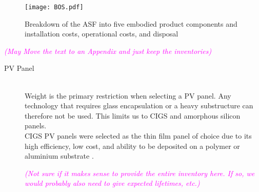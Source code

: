 \begin{figure}[ht]
\begin{center}
\texttt{[image: BOS.pdf]}
\caption{Breakdown of the ASF into five embodied product components and installation costs, operational costs, and disposal}

\label{fig:BOS}
\end{center}
\end{figure}
\textcolor{magenta}{\textit{(May Move the text to an Appendix and just keep the inventories)}}
\begin{description}

\item[PV Panel] \hfill\\
Weight is the primary restriction when selecting a PV panel. Any technology that requires glass encapsulation or a heavy substructure can therefore not be used. This limits us to CIGS and amorphous silicon panels.\\

CIGS PV panels were selected as the thin film panel of choice due to its high efficiency, low cost, and ability to be deposited on a polymer or aluminium substrate \cite{chirilua2011highly}. 


\textcolor{magenta}{\textit{(Not sure if it makes sense to provide the entire inventory here. If so, we would probably also need to give expected lifetimes, etc.)}}



\end{description}
